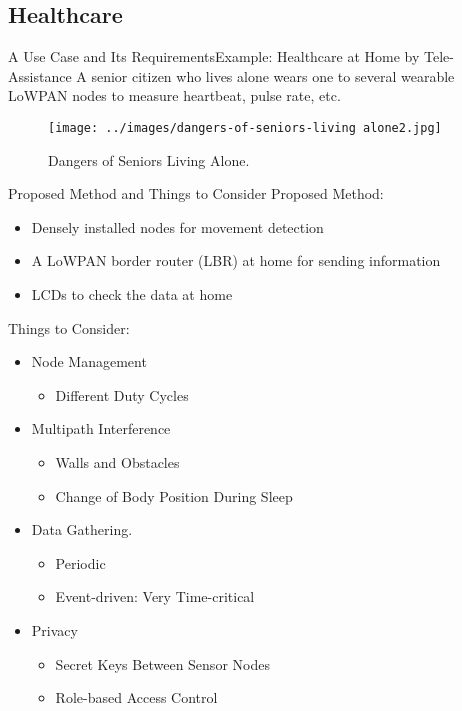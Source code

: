 \documentclass[10pt]{beamer}
\begin{document}
\subsection{Healthcare}
\begin{frame}{A Use Case and Its Requirements}{Example: Healthcare at Home by Tele-Assistance}
    A senior citizen who lives alone wears one to several wearable LoWPAN nodes to measure heartbeat, pulse rate, etc.\cite{rfc6568}
    \begin{figure}[htpb]
        \centering
        \texttt{[image: ../images/dangers-of-seniors-living alone2.jpg]}
        \caption{Dangers of Seniors Living Alone.\cite{Jonahtjw_2019}}
    \end{figure}

\end{frame}

\begin{frame}{Proposed Method and Things to Consider\cite{rfc6568}}
    Proposed Method:
    \begin{itemize}
        \item Densely installed nodes for movement detection
        \item A LoWPAN border router (LBR) at home for sending information
        \item LCDs to check the data at home
    \end{itemize}

    Things to Consider:
    \begin{itemize}
        \item Node Management
            \begin{itemize}
                \item Different Duty Cycles
            \end{itemize}
        \item Multipath Interference
            \begin{itemize}
                \item Walls and Obstacles
                \item Change of Body Position During Sleep
            \end{itemize}
        \item Data Gathering.
            \begin{itemize}
                \item Periodic
                \item Event-driven: Very Time-critical
            \end{itemize}
        \item Privacy
            \begin{itemize}
                \item Secret Keys Between Sensor Nodes
                \item Role-based Access Control
            \end{itemize}
    \end{itemize}
\end{frame}
\end{document}
